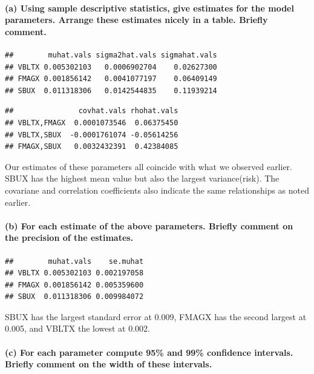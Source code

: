 \documentclass[]{article}
\let\oldparagraph\paragraph
\renewcommand{\paragraph}[1]{\oldparagraph{#1}\mbox{}}
\begin{document}
\paragraph{(a) Using sample descriptive statistics, give estimates for
the model parameters. Arrange these estimates nicely in a table. Briefly
comment.}\label{a-using-sample-descriptive-statistics-give-estimates-for-the-model-parameters.-arrange-these-estimates-nicely-in-a-table.-briefly-comment.}

\begin{verbatim}
##        muhat.vals sigma2hat.vals sigmahat.vals
## VBLTX 0.005302103   0.0006902704    0.02627300
## FMAGX 0.001856142   0.0041077197    0.06409149
## SBUX  0.011318306   0.0142544835    0.11939214
\end{verbatim}

\begin{verbatim}
##               covhat.vals rhohat.vals
## VBLTX,FMAGX  0.0001073546  0.06375450
## VBLTX,SBUX  -0.0001761074 -0.05614256
## FMAGX,SBUX   0.0032432391  0.42384085
\end{verbatim}

Our estimates of these parameters all coincide with what we observed
earlier. SBUX has the highest mean value but also the largest
variance(risk). The covariane and correlation coefficients also indicate
the same relationships as noted earlier.

\paragraph{(b) For each estimate of the above parameters. Briefly
comment on the precision of the
estimates.}\label{b-for-each-estimate-of-the-above-parameters.-briefly-comment-on-the-precision-of-the-estimates.}

\begin{verbatim}
##        muhat.vals    se.muhat
## VBLTX 0.005302103 0.002197058
## FMAGX 0.001856142 0.005359600
## SBUX  0.011318306 0.009984072
\end{verbatim}

SBUX has the largest standard error at 0.009, FMAGX has the second
largest at 0.005, and VBLTX the lowest at 0.002.

\paragraph{(c) For each parameter compute 95\% and 99\% confidence
intervals. Briefly comment on the width of these
intervals.}\label{c-for-each-parameter-compute-95-and-99-confidence-intervals.-briefly-comment-on-the-width-of-these-intervals.}
\end{document}
